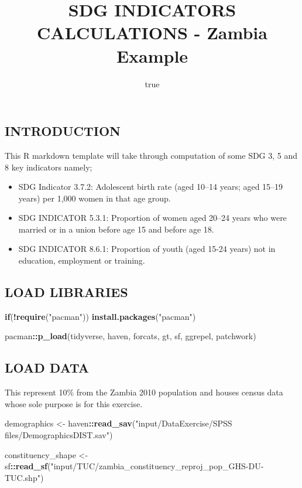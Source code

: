 \documentclass[
]{article}
\title{SDG INDICATORS CALCULATIONS - Zambia Example}
\author{true}
\date{}
\newenvironment{Shaded}{\begin{snugshade}}{\end{snugshade}}
\newcommand{\ControlFlowTok}[1]{\textcolor[rgb]{0.13,0.29,0.53}{\textbf{#1}}}
\newcommand{\FunctionTok}[1]{\textcolor[rgb]{0.13,0.29,0.53}{\textbf{#1}}}
\newcommand{\NormalTok}[1]{#1}
\newcommand{\OtherTok}[1]{\textcolor[rgb]{0.56,0.35,0.01}{#1}}
\newcommand{\SpecialCharTok}[1]{\textcolor[rgb]{0.81,0.36,0.00}{\textbf{#1}}}
\newcommand{\StringTok}[1]{\textcolor[rgb]{0.31,0.60,0.02}{#1}}
\begin{document}
\maketitle

\subsection{INTRODUCTION}\label{introduction}

This R markdown template will take through computation of some SDG 3, 5
and 8 key indicators namely;

\begin{itemize}
\item
  SDG Indicator 3.7.2: Adolescent birth rate (aged 10--14 years; aged
  15--19 years) per 1,000 women in that age group.
\item
  SDG INDICATOR 5.3.1: Proportion of women aged 20--24 years who were
  married or in a union before age 15 and before age 18.
\item
  SDG INDICATOR 8.6.1: Proportion of youth (aged 15-24 years) not in
  education, employment or training.
\end{itemize}

\subsection{LOAD LIBRARIES}\label{load-libraries}

\begin{Shaded}
\begin{Highlighting}[]
\ControlFlowTok{if}\NormalTok{(}\SpecialCharTok{!}\FunctionTok{require}\NormalTok{(}\StringTok{"pacman"}\NormalTok{)) }\FunctionTok{install.packages}\NormalTok{(}\StringTok{"pacman"}\NormalTok{)}

\NormalTok{pacman}\SpecialCharTok{::}\FunctionTok{p\_load}\NormalTok{(tidyverse, haven, forcats, gt, sf, ggrepel, patchwork)}
\end{Highlighting}
\end{Shaded}

\subsection{LOAD DATA}\label{load-data}

This represent 10\% from the Zambia 2010 population and houses census
data whose sole purpose is for this exercise.

\begin{Shaded}
\begin{Highlighting}[]
\NormalTok{demographics }\OtherTok{\textless{}{-}}\NormalTok{ haven}\SpecialCharTok{::}\FunctionTok{read\_sav}\NormalTok{(}\StringTok{"input/DataExercise/SPSS files/DemographicsDIST.sav"}\NormalTok{)}

\NormalTok{constituency\_shape }\OtherTok{\textless{}{-}}\NormalTok{ sf}\SpecialCharTok{::}\FunctionTok{read\_sf}\NormalTok{(}\StringTok{"input/TUC/zambia\_constituency\_reproj\_pop\_GHS{-}DU{-}TUC.shp"}\NormalTok{)}
\end{Highlighting}
\end{Shaded}
\end{document}
